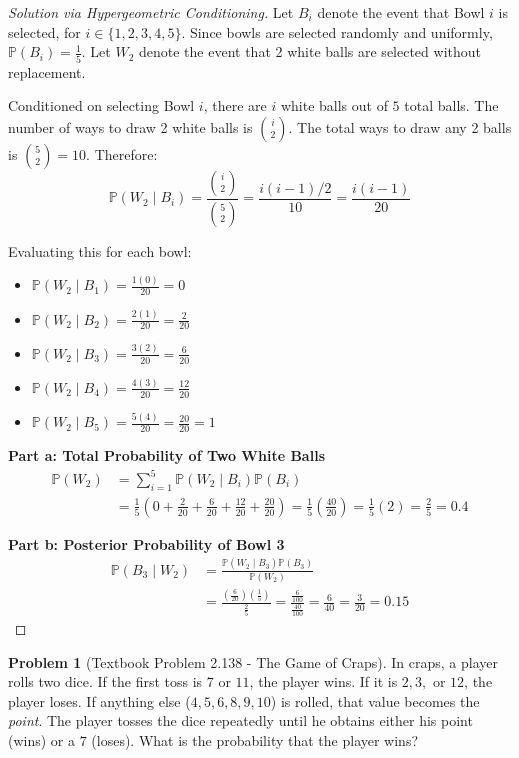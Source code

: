 \documentclass[11pt, letterpaper]{article}
\theoremstyle{definition}
\newtheorem{problem}{Problem}
\renewcommand{\P}{\mathbb{P}}
\begin{document}
\begin{proof}[Solution via Hypergeometric Conditioning]
Let $B_i$ denote the event that Bowl $i$ is selected, for $i \in \{1, 2, 3, 4, 5\}$. Since bowls are selected randomly and uniformly, $\P(B_i) = \frac{1}{5}$.
Let $W_2$ denote the event that 2 white balls are selected without replacement.

Conditioned on selecting Bowl $i$, there are $i$ white balls out of $5$ total balls. The number of ways to draw 2 white balls is $\binom{i}{2}$. The total ways to draw any 2 balls is $\binom{5}{2} = 10$. Therefore:
\[ \P(W_2 \mid B_i) = \frac{\binom{i}{2}}{\binom{5}{2}} = \frac{i(i-1) / 2}{10} = \frac{i(i-1)}{20} \]

Evaluating this for each bowl:
\begin{itemize}
    \item $\P(W_2 \mid B_1) = \frac{1(0)}{20} = 0$
    \item $\P(W_2 \mid B_2) = \frac{2(1)}{20} = \frac{2}{20}$
    \item $\P(W_2 \mid B_3) = \frac{3(2)}{20} = \frac{6}{20}$
    \item $\P(W_2 \mid B_4) = \frac{4(3)}{20} = \frac{12}{20}$
    \item $\P(W_2 \mid B_5) = \frac{5(4)}{20} = \frac{20}{20} = 1$
\end{itemize}

\textbf{Part a: Total Probability of Two White Balls}
\begin{align*}
    \P(W_2) &= \sum_{i=1}^{5} \P(W_2 \mid B_i)\P(B_i) \\
    &= \frac{1}{5} \left( 0 + \frac{2}{20} + \frac{6}{20} + \frac{12}{20} + \frac{20}{20} \right) = \frac{1}{5} \left( \frac{40}{20} \right) = \frac{1}{5}(2) = \frac{2}{5} = 0.4
\end{align*}

\textbf{Part b: Posterior Probability of Bowl 3}
\begin{align*}
    \P(B_3 \mid W_2) &= \frac{\P(W_2 \mid B_3)\P(B_3)}{\P(W_2)} \\
    &= \frac{ \left(\frac{6}{20}\right) \left(\frac{1}{5}\right) }{ \frac{2}{5} } = \frac{ \frac{6}{100} }{ \frac{40}{100} } = \frac{6}{40} = \frac{3}{20} = 0.15
\end{align*}
\end{proof}

\vspace{0.5cm}

\begin{problem}[Textbook Problem 2.138 - The Game of Craps]
In craps, a player rolls two dice. If the first toss is $7$ or $11$, the player wins. If it is $2, 3,$ or $12$, the player loses. If anything else ($4, 5, 6, 8, 9, 10$) is rolled, that value becomes the \textit{point}. The player tosses the dice repeatedly until he obtains either his point (wins) or a $7$ (loses). What is the probability that the player wins?
\end{problem}
\end{document}
